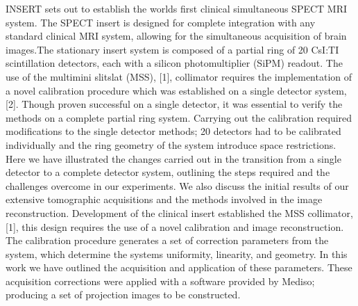 INSERT sets out to establish the worlds first clinical simultaneous
SPECT MRI system. The SPECT insert is
designed for complete integration with any standard clinical
MRI system, allowing for the simultaneous acquisition of brain
images.The stationary insert system is composed of a partial
ring of 20 CsI:TI scintillation detectors, each with a silicon
photomultiplier (SiPM) readout. The use of the multimini slitslat
(MSS), [1], collimator requires the implementation of a
novel calibration procedure which was established on a single
detector system, [2]. Though proven successful on a single
detector, it was essential to verify the methods on a complete
partial ring system. Carrying out the calibration required
modifications to the single detector methods; 20 detectors had
to be calibrated individually and the ring geometry of the
system introduce space restrictions. Here we have illustrated
the changes carried out in the transition from a single detector to a complete detector system, outlining the steps required and
the challenges overcome in our experiments. We also discuss
the initial results of our extensive tomographic acquisitions
and the methods involved in the image reconstruction.
Development of the clinical insert established the MSS collimator,
[1], this design requires the use of a novel calibration
and image reconstruction. The calibration procedure generates
a set of correction parameters from the system, which determine
the systems uniformity, linearity, and geometry. In this
work we have outlined the acquisition and application of these
parameters. These acquisition corrections were applied with a
software provided by Mediso; producing a set of projection
images to be constructed.


